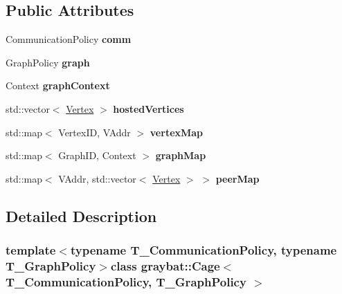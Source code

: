 \subsection*{Public Attributes}
\begin{DoxyCompactItemize}
\item 
\hypertarget{structgraybat_1_1Cage_a814df63d13307540a09a734365c6bc17}{}Communication\+Policy {\bfseries comm}\label{structgraybat_1_1Cage_a814df63d13307540a09a734365c6bc17}

\item 
\hypertarget{structgraybat_1_1Cage_ac65609fabcd12ea956a50dfc9f7f8822}{}Graph\+Policy {\bfseries graph}\label{structgraybat_1_1Cage_ac65609fabcd12ea956a50dfc9f7f8822}

\item 
\hypertarget{structgraybat_1_1Cage_aaae110547d929e8f93c4d43b5c7f5012}{}Context {\bfseries graph\+Context}\label{structgraybat_1_1Cage_aaae110547d929e8f93c4d43b5c7f5012}

\item 
\hypertarget{structgraybat_1_1Cage_acae38e3176ae872f115bc277ed896c99}{}std\+::vector$<$ \hyperlink{structgraybat_1_1CommunicationVertex}{Vertex} $>$ {\bfseries hosted\+Vertices}\label{structgraybat_1_1Cage_acae38e3176ae872f115bc277ed896c99}

\item 
\hypertarget{structgraybat_1_1Cage_a39ab4a85708473a09befb09b2d41d2e5}{}std\+::map$<$ Vertex\+I\+D, V\+Addr $>$ {\bfseries vertex\+Map}\label{structgraybat_1_1Cage_a39ab4a85708473a09befb09b2d41d2e5}

\item 
\hypertarget{structgraybat_1_1Cage_aac8f8f77d9b63e53b855c306cb21bda6}{}std\+::map$<$ Graph\+I\+D, Context $>$ {\bfseries graph\+Map}\label{structgraybat_1_1Cage_aac8f8f77d9b63e53b855c306cb21bda6}

\item 
\hypertarget{structgraybat_1_1Cage_af0cbddbcb1a81ac31b0c6307fd3df542}{}std\+::map$<$ V\+Addr, std\+::vector$<$ \hyperlink{structgraybat_1_1CommunicationVertex}{Vertex} $>$ $>$ {\bfseries peer\+Map}\label{structgraybat_1_1Cage_af0cbddbcb1a81ac31b0c6307fd3df542}

\end{DoxyCompactItemize}


\subsection{Detailed Description}
\subsubsection*{template$<$typename T\+\_\+\+Communication\+Policy, typename T\+\_\+\+Graph\+Policy$>$class graybat\+::\+Cage$<$ T\+\_\+\+Communication\+Policy, T\+\_\+\+Graph\+Policy $>$}

